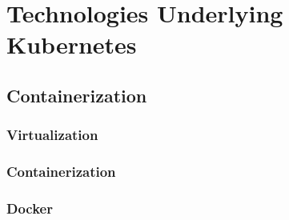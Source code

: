 \documentclass[twoside]{report}
\begin{document}
\section{Technologies Underlying Kubernetes}

\subsection{Containerization}

\subsubsection{Virtualization}

\subsubsection{Containerization}

\subsubsection{Docker}



\end{document}
